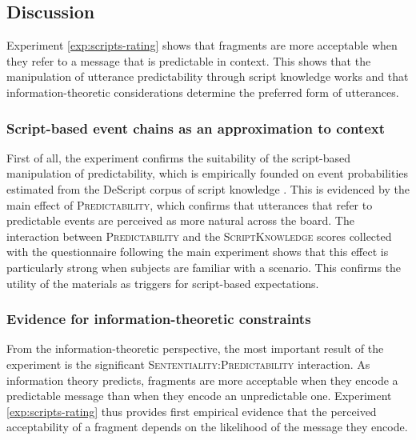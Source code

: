 \subsection{Discussion}
\label{sec:scripts-rating-discussion}
Experiment \ref{exp:scripts-rating} shows that fragments are more acceptable when they refer to a message that is predictable in context. This shows that the manipulation of utterance predictability through script knowledge works and that information-theoretic considerations determine the preferred form of utterances. 

\subsubsection{Script-based event chains as an approximation to context}
First of all, the experiment confirms the suitability of the script-based manipulation of predictability, which is empirically founded on event probabilities estimated from the DeScript corpus of script knowledge \citep{wanzare.etal2016}. This is evidenced by the main effect of \textsc{Predictability}, which confirms that utterances that refer to predictable events are perceived as more natural across the board. The interaction between \textsc{Predictability} and the \textsc{ScriptKnowledge} scores collected with the questionnaire following the main experiment shows that this effect is particularly strong when subjects are familiar with a scenario. This confirms the utility of the materials as triggers for script-based expectations.

\subsubsection{Evidence for information-theoretic constraints}

From the information-theoretic perspective, the most important result of the experiment is the significant \textsc{Sententiality:Predictability} interaction. As information theory predicts, fragments are more acceptable when they encode a predictable message than when they encode an unpredictable one. Experiment \ref{exp:scripts-rating} thus provides first empirical evidence that the perceived acceptability of a fragment depends on the likelihood of the message they encode. 

